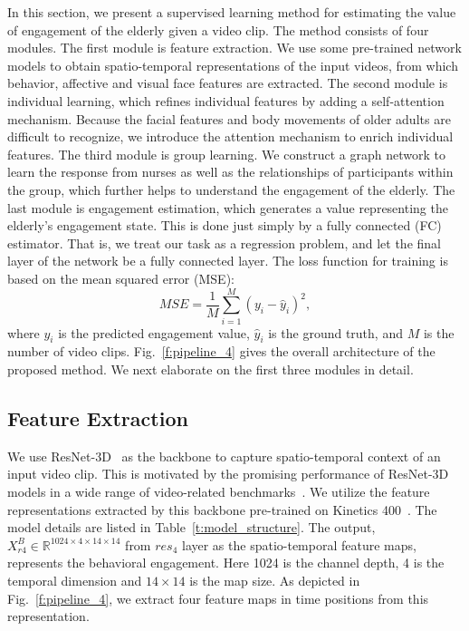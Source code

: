 \documentclass[VANCOUVER,STIX1COL]{WileyNJD-v2}
\begin{document}
In this section, we present a supervised learning method for estimating the value of engagement of the elderly given a video clip. The method consists of four modules.
The first module is feature extraction. We use some pre-trained network models to obtain spatio-temporal representations of the input videos, from which behavior, affective and visual face features are extracted. The second module is individual learning, which refines individual features by adding a self-attention mechanism. Because the facial features and body movements of older adults are difficult to recognize, we introduce the attention mechanism to enrich individual features. The third module is group learning. We construct a graph network to learn the response from nurses as well as the relationships of participants within the group, which further helps to understand the engagement of the elderly. The last module is engagement estimation, which generates a value representing the elderly's engagement state. This is done just simply by a fully connected (FC) estimator. That is, we treat our task as a regression problem, and let the final layer of the network be a fully connected layer.
The loss function for training is based on the mean squared error (MSE):
\begin{equation}
  M\!S\!E = \frac{1}{M}\sum_{i=1}^M(y_i-\hat{y}_i)^2,
  \label{eq:mse}
\end{equation}
where $y_i$ is the predicted engagement value, $\hat{y}_i$ is the ground truth, and $M$ is the number of video clips. Fig.~\ref{f:pipeline_4} gives the overall architecture of the proposed method. We next elaborate on the first three modules in detail.

\subsection{Feature Extraction}
\label{subs:Feature_Extraction}

We use ResNet-3D~\cite{Hara2018Can} as the backbone to capture spatio-temporal context of an input video clip. This is motivated by the promising performance of ResNet-3D models in a wide range of video-related benchmarks~\cite{Chen2021Deep}. We utilize the feature representations extracted by this backbone pre-trained on Kinetics 400~\cite{Kay2017Kinetics}. The model details are listed in Table~\ref{t:model_structure}. The output, $X^B_{r4} \in \mathbb{R}^{1024\times4\times14\times14}$ from $res_4$ layer as the spatio-temporal feature maps, represents the behavioral engagement. Here 1024 is the channel depth, 4 is the temporal dimension and $14\times14$ is the map size. As depicted in Fig.~\ref{f:pipeline_4}, we extract four feature maps in time positions from this representation.
\end{document}
